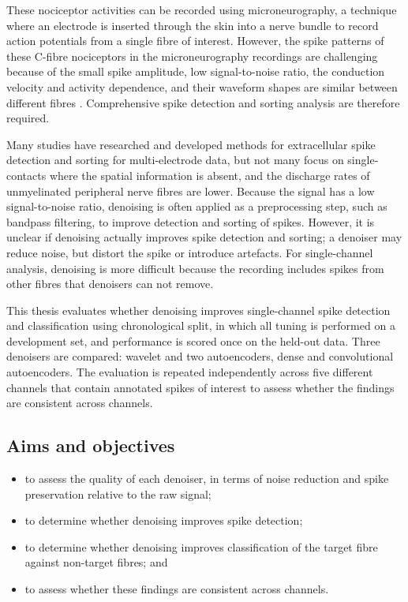 \documentclass[ %
                    author={Rzan Alkabier},
                    supervisor={Dr. Zahraa Abdallah},
                    degree={MSc},
                     title={Denoising Extracellular Recording for Spike Detection and Classification on Single Channels},
                    subtitle={Does denoising improve detection and classification performance?},
                      type={},
                      year={2026}]{dissertation}
\begin{document}
\noindent
These nociceptor activities can be recorded using microneurography, a technique where an electrode is inserted through the skin into a nerve bundle to record action potentials from a single fibre of interest. However, the spike patterns of these C-fibre nociceptors in the microneurography recordings are challenging because of the small spike amplitude, low signal-to-noise ratio, the conduction velocity and activity dependence, and their waveform shapes are similar between different fibres \cite{troglio_hybrid_2026}. Comprehensive spike detection and sorting analysis are therefore required. 
\bigskip

\noindent
Many studies have researched and developed methods for extracellular spike detection and sorting for multi-electrode data, but not many focus on single-contacts where the spatial information is absent, and the discharge rates of unmyelinated peripheral nerve fibres are lower. Because the signal has a low signal-to-noise ratio, denoising is often applied as a preprocessing step, such as bandpass filtering, to improve detection and sorting of spikes. However, it is unclear if denoising actually improves spike detection and sorting; a denoiser may reduce noise, but distort the spike or introduce artefacts. For single-channel analysis, denoising is more difficult because the recording includes spikes from other fibres that denoisers can not remove.
\bigskip

\noindent
This thesis evaluates whether denoising improves single-channel spike detection and classification using chronological split, in which all tuning is performed on a development set, and performance is scored once on the held-out data. Three denoisers are compared: wavelet and two autoencoders, dense and convolutional autoencoders. The evaluation is repeated independently across five different channels that contain annotated spikes of interest to assess whether the findings are consistent across channels. 

\subsection{Aims and objectives}
\begin{itemize}
    \item to assess the quality of each denoiser, in terms of noise reduction and spike preservation relative to the raw signal; 
    \item to determine whether denoising improves spike detection;
    \item to determine whether denoising improves classification of the target fibre against non-target fibres; and 
    \item to assess whether these findings are consistent across channels. 
\end{itemize}
\end{document}
